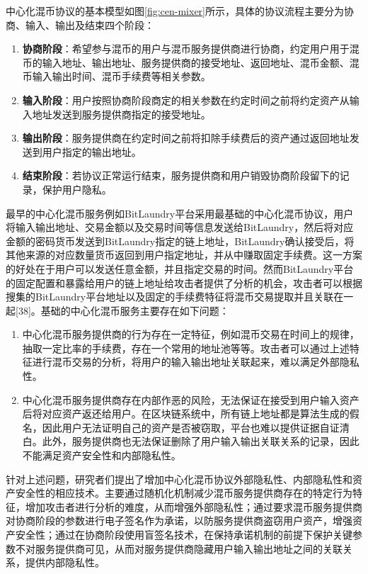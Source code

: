 中心化混币协议的基本模型如图\ref{fig:cen-mixer}所示，具体的协议流程主要分为协商、输入、输出及结束四个阶段：

\begin{enumerate}
	\item \textbf{协商阶段}：希望参与混币的用户与混币服务提供商进行协商，约定用户用于混币的输入地址、输出地址、服务提供商的接受地址、返回地址、混币金额、混币输入输出时间、混币手续费等相关参数。
	\item \textbf{输入阶段}：用户按照协商阶段商定的相关参数在约定时间之前将约定资产从输入地址发送到服务提供商指定的接受地址。
	\item \textbf{输出阶段}：服务提供商在约定时间之前将扣除手续费后的资产通过返回地址发送到用户指定的输出地址。
	\item \textbf{结束阶段}：若协议正常运行结束，服务提供商和用户销毁协商阶段留下的记录，保护用户隐私。
\end{enumerate}

最早的中心化混币服务例如BitLaundry平台采用最基础的中心化混币协议，用户将输入输出地址、交易金额以及交易时间等信息发送给BitLaundry，然后将对应金额的密码货币发送到BitLaundry指定的链上地址，BitLaundry确认接受后，将其他来源的对应数量货币返回到用户指定地址，并从中赚取固定手续费。这一方案的好处在于用户可以发送任意金额，并且指定交易的时间。然而BitLaundry平台的固定配置和暴露给用户的链上地址给攻击者提供了分析的机会，攻击者可以根据搜集的BitLaundry平台地址以及固定的手续费特征将混币交易提取并且关联在一起[38]。基础的中心化混币服务主要存在如下问题：

\begin{enumerate}
	\item 中心化混币服务提供商的行为存在一定特征，例如混币交易在时间上的规律，抽取一定比率的手续费，存在一个常用的地址池等等。攻击者可以通过上述特征进行混币交易的分析，将用户的输入输出地址关联起来，难以满足外部隐私性。
	\item 中心化混币服务提供商存在内部作恶的风险，无法保证在接受到用户输入资产后将对应资产返还给用户。在区块链系统中，所有链上地址都是算法生成的假名，因此用户无法证明自己的资产是否被窃取，平台也难以提供证据自证清白。此外，服务提供商也无法保证删除了用户输入输出关联关系的记录，因此不能满足资产安全性和内部隐私性。
\end{enumerate}
	
针对上述问题，研究者们提出了增加中心化混币协议外部隐私性、内部隐私性和资产安全性的相应技术。主要通过随机化机制减少混币服务提供商存在的特定行为特征，增加攻击者进行分析的难度，从而增强外部隐私性；通过要求混币服务提供商对协商阶段的参数进行电子签名作为承诺，以防服务提供商盗窃用户资产，增强资产安全性；通过在协商阶段使用盲签名技术，在保持承诺机制的前提下保护关键参数不对服务提供商可见，从而对服务提供商隐藏用户输入输出地址之间的关联关系，提供内部隐私性。

